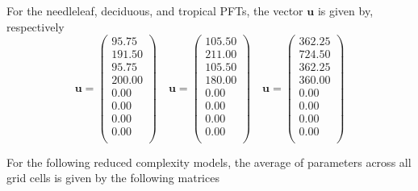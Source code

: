 \documentclass[draft,linenumbers]{agujournal}
\begin{document}
For the needleleaf, deciduous, and tropical PFTs, the vector ${\bm u}$ is given by, respectively
\begin{equation}
{\bm u} =
\begin{pmatrix}{}
  95.75 \\ 
  191.50 \\ 
  95.75 \\ 
  200.00 \\ 
  0.00 \\ 
  0.00 \\ 
  0.00 \\ 
  0.00 \\ 
  \end{pmatrix}
\quad {\bm u}=
\begin{pmatrix}{}
  105.50 \\ 
  211.00 \\ 
  105.50 \\ 
  180.00 \\ 
  0.00 \\ 
  0.00 \\ 
  0.00 \\ 
  0.00 \\ 
  \end{pmatrix}
\quad {\bm u}=
\begin{pmatrix}{}
  362.25 \\ 
  724.50 \\ 
  362.25 \\ 
  360.00 \\ 
  0.00 \\ 
  0.00 \\ 
  0.00 \\ 
  0.00 \\ 
  \end{pmatrix}
\end{equation}

For the following reduced complexity models, the average of parameters across all grid cells is given by the following matrices
\end{document}
